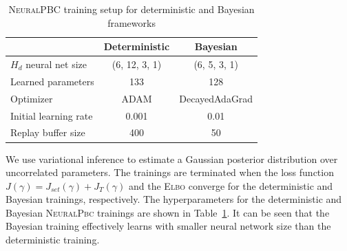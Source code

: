 \begin{table}[b]
    \centering
    \caption{\textsc{NeuralPBC} training setup for deterministic and Bayesian frameworks}
    \begin{tabular}{lcc}
    \toprule
    & Deterministic & Bayesian \\
    \midrule
        $H_d$ neural net size & (6, 12, 3, 1) & (6, 5, 3, 1)\\
        Learned parameters & 133 & 128  \\
        Optimizer & \textsc{ADAM} & DecayedAdaGrad\\
        Initial learning rate & 0.001 & 0.01\\
        Replay buffer size & 400 & 50\\
    \bottomrule
    \end{tabular}
    \label{tab:training_setup_neuralpbc}
\end{table}
%
We use variational inference to estimate a Gaussian posterior distribution
over uncorrelated parameters. The trainings are terminated when the loss
function $J(\gamma) = J_{set}(\gamma) + J_T(\gamma)$ and the \textsc{Elbo}
converge for the deterministic and Bayesian trainings, respectively.
%
The hyperparameters for the deterministic and Bayesian \textsc{NeuralPbc}
trainings are shown in Table~\ref{tab:training_setup_neuralpbc}.
%
It can be seen that the Bayesian training effectively learns with smaller
neural network size than the deterministic training.


